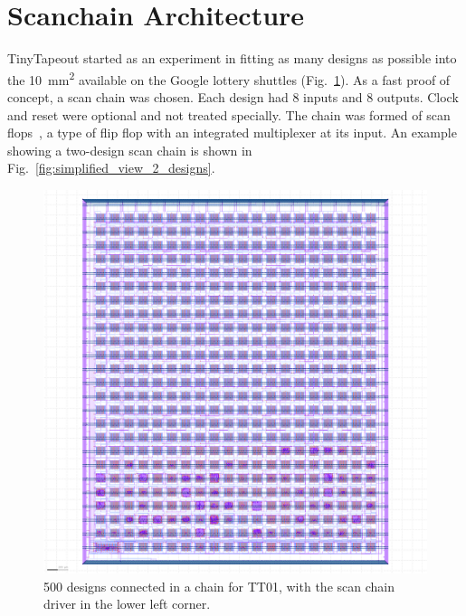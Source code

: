 \section{Scanchain Architecture}
\label{sec:scanchain_arch}

TinyTapeout started as an experiment in fitting as many designs as possible into the \qty{10}{\milli\meter\squared} available on the Google lottery shuttles (Fig.~\ref{fig:500_designs_chain_TT01}).
As a fast proof of concept, a scan chain was chosen.
Each design had 8 inputs and 8 outputs.
Clock and reset were optional and not treated specially. The chain was formed of scan flops~\cite{skywaterpdk}, a type of flip flop with an integrated multiplexer at its input. An example showing a two-design scan chain is shown in Fig.~\ref{fig:simplified_view_2_designs}.

\begin{figure}[!t]
\centering
\includegraphics[width=1\columnwidth]{./Figs/tt01_whole_die.png}
\caption{500 designs connected in a chain for TT01, with the scan chain driver in the lower left corner.}
\label{fig:500_designs_chain_TT01}
\end{figure}

